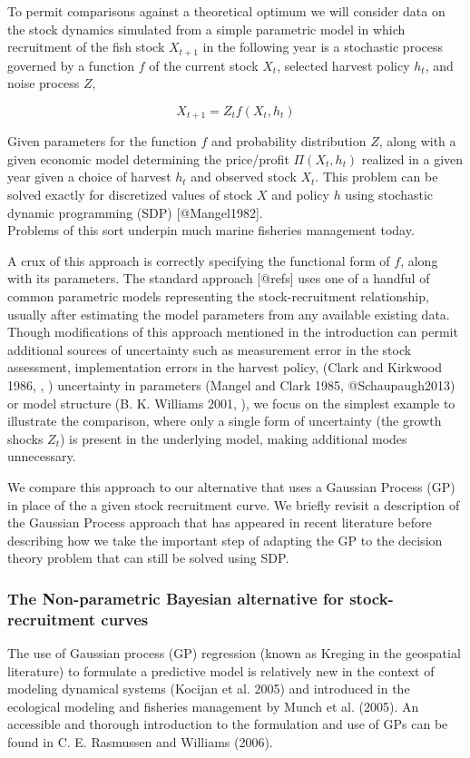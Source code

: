 \documentclass[author-year, review]{elsarticle} %
\begin{document}
To permit comparisons against a theoretical optimum we will consider
data on the stock dynamics simulated from a simple parametric model in
which recruitment of the fish stock $X_{t+1}$ in the following year is a
stochastic process governed by a function $f$ of the current stock
$X_t$, selected harvest policy $h_t$, and noise process $Z$,

\[X_{t+1} = Z_t f(X_t, h_t) \]

Given parameters for the function $f$ and probability distribution $Z$,
along with a given economic model determining the price/profit
$\Pi(X_t, h_t)$ realized in a given year given a choice of harvest $h_t$
and observed stock $X_t$. This problem can be solved exactly for
discretized values of stock $X$ and policy $h$ using stochastic dynamic
programming (SDP) {[}@Mangel1982{]}.\\Problems of this sort underpin
much marine fisheries management today.

A crux of this approach is correctly specifying the functional form of
$f$, along with its parameters. The standard approach {[}@refs{]} uses
one of a handful of common parametric models representing the
stock-recruitment relationship, usually after estimating the model
parameters from any available existing data. Though modifications of
this approach mentioned in the introduction can permit additional
sources of uncertainty such as measurement error in the stock
assessment, implementation errors in the harvest policy, (Clark and
Kirkwood 1986, , ) uncertainty in parameters (Mangel and Clark 1985,
@Schaupaugh2013) or model structure (B. K. Williams 2001, ), we focus on
the simplest example to illustrate the comparison, where only a single
form of uncertainty (the growth shocks $Z_t$) is present in the
underlying model, making additional modes unnecessary.

We compare this approach to our alternative that uses a Gaussian Process
(GP) in place of the a given stock recruitment curve. We briefly revisit
a description of the Gaussian Process approach that has appeared in
recent literature before describing how we take the important step of
adapting the GP to the decision theory problem that can still be solved
using SDP.

\subsubsection{The Non-parametric Bayesian alternative for
stock-recruitment curves}

The use of Gaussian process (GP) regression (known as Kreging in the
geospatial literature) to formulate a predictive model is relatively new
in the context of modeling dynamical systems (Kocijan et al. 2005) and
introduced in the ecological modeling and fisheries management by Munch
et al. (2005). An accessible and thorough introduction to the
formulation and use of GPs can be found in C. E. Rasmussen and Williams
(2006).
\end{document}
